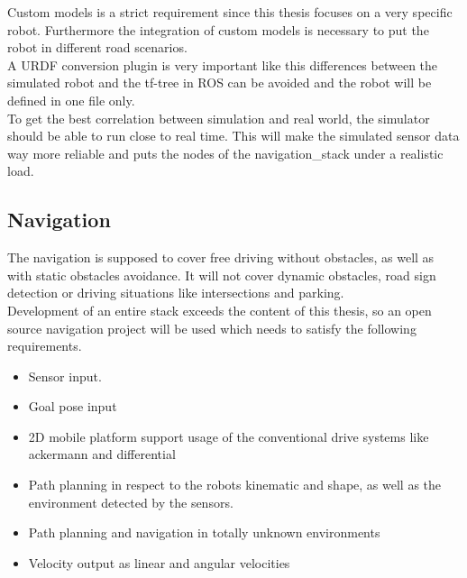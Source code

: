 Custom models is a strict requirement since this thesis focuses on a very specific robot. Furthermore the integration of custom models is necessary to put the robot in different road scenarios.\\

A URDF conversion plugin is very important like this differences between the simulated robot and the tf-tree in ROS can be avoided and the robot will be defined in one file only.\\

To get the best correlation between simulation and real world, the simulator should be able to run close to real time. This will make the simulated sensor data way more reliable and puts the nodes of the navigation\_stack under a realistic load.

\subsection{Navigation}
The navigation is supposed to cover free driving without obstacles, as well as with static obstacles avoidance. It will not cover dynamic obstacles, road sign detection or driving situations like intersections and parking.\\

Development of an entire stack exceeds the content of this thesis, so an open source navigation project will be used which needs to satisfy the following requirements.

\begin{itemize}
	\item Sensor input.
	\item Goal pose input
	\item 2D mobile platform support usage of the conventional drive systems like ackermann and differential
	\item Path planning in respect to the robots kinematic and shape, as well as the environment detected by the sensors.
	\item Path planning and navigation in totally unknown environments
	\item Velocity output as linear and angular velocities
\end{itemize}

